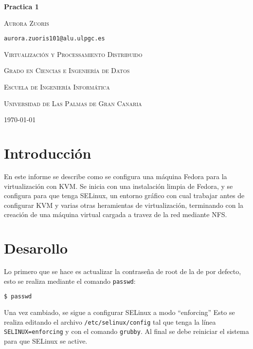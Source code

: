 \documentclass{article}
\begin{document}
\begin{titlepage}
	\centering
	{\huge\bfseries Practica 1\par}
	\vspace{1cm}
	{\scshape\Large Aurora Zuoris \par\tt{aurora.zuoris101@alu.ulpgc.es}\par}
	\vspace{3cm}
	{\scshape\large Virtualización y Processamiento Distribuido\par}
	\vspace{1cm}
	{\scshape\large Grado en Ciencias e Ingeniería de Datos\par}
	\vspace{1cm}
	{\scshape\large Escuela de Ingeniería Informática\par}
	\vspace{1cm}
	{\scshape\large Universidad de Las Palmas de Gran Canaria\par}
	\vspace{1cm}
	{\scshape\large \today{} \par}
\end{titlepage}

\newpage

\tableofcontents

\newpage

\section{Introducción}

En este informe se describe como se configura una máquina Fedora para
la virtualización con KVM.
Se inicia con una instalación limpia de Fedora,
y se configura para que tenga SELinux, un entorno gráfico
con cual trabajar antes de configurar KVM y
varias otras heramientas de virtualización,
terminando con la creación de una máquina virtual
cargada a travez de la red mediante NFS.

\section{Desarollo}

Lo primero que se hace es actualizar la contraseña de root de la de por defecto,
esto se realiza mediante el comando \texttt{passwd}:

\vspace{0.2cm}
\texttt{\$ passwd}
\vspace{0.2cm}

Una vez cambiado, se sigue a configurar SELinux a modo ``enforcing''
Esto se realiza editando el archivo \texttt{/etc/selinux/config} tal que tenga
la línea \texttt{SELINUX=enforcing}
y con el comando \texttt{grubby}. Al final se debe reiniciar el sistema para que
SELinux se active.
\end{document}
